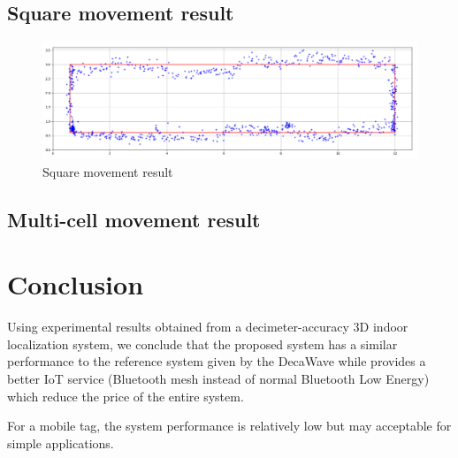 \documentclass[\main/main.tex]{subfiles}
\begin{document}
\subsection{Square movement result}

\begin{figure}[H]     
    \centering
    \includegraphics[width=1\textwidth]{result_square.png}
    \caption{Square movement result}
    \label{fig:result_square}
\end{figure}

\subsection{Multi-cell movement result}

\section{Conclusion}
Using experimental results obtained from a decimeter-accuracy 3D indoor localization system, we conclude that the proposed system has a similar performance to the reference system given by the DecaWave while provides a better IoT service (Bluetooth mesh instead of normal Bluetooth Low Energy) which reduce the price of the entire system.

For a mobile tag, the system performance is relatively low but may acceptable for simple applications.
\end{document}
